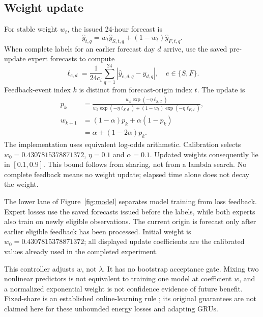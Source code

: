 \documentclass[pdflatex,iicol,sn-mathphys-num]{sn-jnl}
\begin{document}
\subsection{Weight update}
For stable weight $w_t$, the issued 24-hour forecast is
\begin{equation}
\hat y_{t,q}=w_t\hat y_{S,t,q}+(1-w_t)\hat y_{F,t,q}.
\label{eq:fusion}\end{equation}
When complete labels for an earlier forecast day $d$ arrive, use the saved pre-update expert forecasts to compute
\begin{equation}
\ell_{e,d}=\frac{1}{24c_i}\sum_{q=1}^{24}|\hat y_{e,d,q}-y_{d,q}|,
\quad e\in\{S,F\}.
\end{equation}
Feedback-event index $k$ is distinct from forecast-origin index $t$. The update is
\begin{equation}\begin{aligned}
p_k&=\frac{w_k\exp(-\eta\ell_{S,d})}
{w_k\exp(-\eta\ell_{S,d})+(1-w_k)\exp(-\eta\ell_{F,d})},\\
w_{k+1}&=(1-\alpha)p_k+\alpha(1-p_k)\\
&=\alpha+(1-2\alpha)p_k.
\end{aligned}\label{eq:fixedshare}\end{equation}
The implementation uses equivalent log-odds arithmetic. Calibration selects $w_0=0.4307815378871372$, $\eta=0.1$ and $\alpha=0.1$. Updated weights consequently lie in $[0.1,0.9]$. This bound follows from sharing, not from a lambda search. No complete feedback means no weight update; elapsed time alone does not decay the weight.

The lower lane of Figure~\ref{fig:model} separates model training from loss feedback. Expert losses use the saved forecasts issued before the labels, while both experts also train on newly eligible observations. The current origin is forecast only after earlier eligible feedback has been processed. Initial weight is $w_0=0.4307815378871372$; all displayed update coefficients are the calibrated values already used in the completed experiment.

This controller adjusts $w$, not $\lambda$. It has no bootstrap acceptance gate. Mixing two nonlinear predictors is not equivalent to training one model at coefficient $w$, and a normalized exponential weight is not confidence evidence of future benefit. Fixed-share is an established online-learning rule \cite{herbster1998}; its original guarantees are not claimed here for these unbounded energy losses and adapting GRUs.
\end{document}

